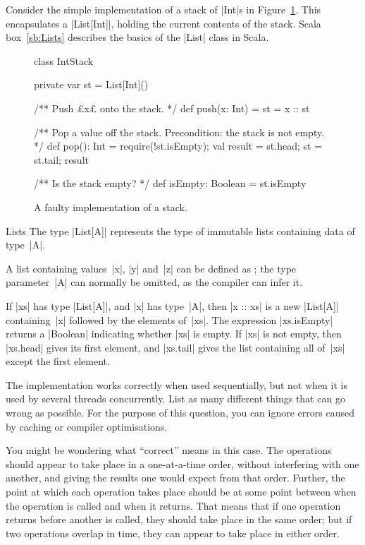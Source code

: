 \begin{questionS}
\label{exercise:stackRace}
Consider the simple implementation of a stack of |Int|s in
Figure~\ref{fig:stackRace}.  This encapsulates a |List[Int]|, holding the
current contents of the stack.  Scala box~\ref{sb:Lists} describes the basics
of the |List| class in Scala. 


\begin{figure}
\begin{scala}
class IntStack{
  private var st = List[Int]()

  /** Push £x£ onto the stack. */
  def push(x: Int) = { st = x :: st }

  /** Pop a value off the stack.  Precondition: the stack is not empty. */
  def pop(): Int = {
    require(!st.isEmpty); val result = st.head; st = st.tail; result
  }

  /** Is the stack empty? */
  def isEmpty: Boolean = st.isEmpty
}
\end{scala}
\caption{A faulty implementation of a stack.}
\label{fig:stackRace}
\end{figure}


\begin{scalaBox}{Lists}
\label{sb:Lists}
The type |List[A]| represents the type of immutable lists containing data of
type~|A|.

A list containing values~|x|, |y| and~|z| can be defined as ; the type parameter~|A| can normally be omitted, as the compiler can
infer it.

If |xs| has type |List[A]|, and |x| has type~|A|, then |x :: xs| is a new
|List[A]| containing~|x| followed by the elements of~|xs|.  The expression
|xs.isEmpty| returns a |Boolean| indicating whether |xs| is empty.  If |xs| is
not empty, then |xs.head| gives its first element, and |xs.tail| gives the
list containing all of~|xs| except the first element.
\end{scalaBox}


The implementation works correctly when used sequentially, but not when it is
used by several threads concurrently.  List as many different things that can
go wrong as possible.  For the purpose of this question, you can ignore errors
caused by caching or compiler optimisations.

You might be wondering what ``correct'' means in this case.  The operations
should appear to take place in a one-at-a-time order, without interfering with
one another, and giving the results one would expect from that order.
Further, the point at which each operation takes place should be at some point
between when the operation is called and when it returns.  That means that if
one operation returns before another is called, they should take place in the
same order; but if two operations overlap in time, they can appear to take
place in either order.


\end{questionS}

